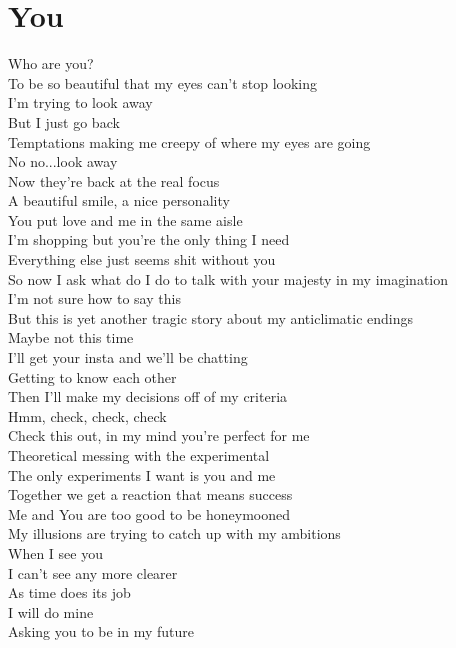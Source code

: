 \documentclass[12pt, b5paper, oneside]{book}
\begin{document}
\section{You}
Who are you?
\\To be so beautiful that my eyes can't stop looking 
\\I'm trying to look away 
\\But I just go back
\\Temptations making me creepy of where my eyes are going 
\\No no...look away 
\\Now they're back at the real focus 
\\A beautiful smile, a nice personality 
\\You put love and me in the same aisle
\\I'm shopping but you're the only thing I need 
\\Everything else just seems shit without you 
\\So now I ask what do I do to talk with your majesty in my imagination 
\\I'm not sure how to say this
\\But this is yet another tragic story about my anticlimatic endings 
\\Maybe not this time
\\I'll get your insta and we'll be chatting 
\\Getting to know each other 
\\Then I'll make my decisions off of my criteria 
\\Hmm, check, check, check
\\Check this out, in my mind you're perfect for me 
\\Theoretical messing with the experimental
\\The only experiments I want is you and me 
\\Together we get a reaction that means success 
\\Me and You are too good to be honeymooned 
\\My illusions are trying to catch up with my ambitions 
\\When I see you 
\\I can't see any more clearer
\\As time does its job 
\\I will do mine 
\\Asking you to be in my future
\newpage
\end{document}
